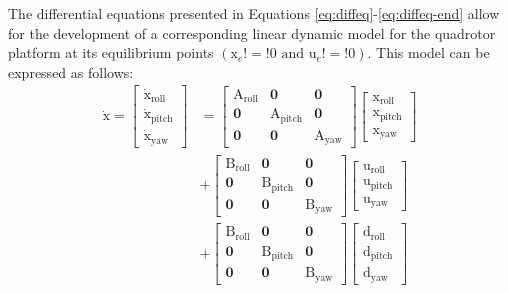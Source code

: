\documentclass[3p,times]{elsarticle}
\begin{document}
The differential equations presented in Equations \eqref{eq:diffeq}-\eqref{eq:diffeq-end} allow for the development of a corresponding linear dynamic model for the quadrotor platform at its equilibrium points $(\boldsymbol{{\mathrm{x}}}_e!=!0 \text{ and } \boldsymbol{{\mathrm{u}}}_e!=!0)$. This model can be expressed as follows:
\begin{equation}
	\begin{split}
		\boldsymbol{{\mathrm{\dot x}}} = \begin{bmatrix}
			\boldsymbol{{\mathrm{\dot x_{\text{roll}}}}}\\
			\boldsymbol{{\mathrm{\dot x_{\text{pitch}}}}}\\
			\boldsymbol{{\mathrm{\dot x_{\text{yaw}}}}}
		\end{bmatrix} &= \begin{bmatrix}
			\boldsymbol{{\mathrm{A_{\text{roll}}}}} & \boldsymbol{0} & \boldsymbol{0}\\
			\boldsymbol{0} & \boldsymbol{{\mathrm{A_{\text{pitch}}}}} & \boldsymbol{0} \\
			\boldsymbol{0} & \boldsymbol{0} & \boldsymbol{{\mathrm{A_{\text{yaw}}}}}
		\end{bmatrix} \begin{bmatrix}
			\boldsymbol{{\mathrm{x_{\text{roll}}}}}\\
			\boldsymbol{{\mathrm{x_{\text{pitch}}}}}\\
			\boldsymbol{{\mathrm{x_{\text{yaw}}}}}
		\end{bmatrix}
		\\[1em]
		& + \begin{bmatrix}
			\boldsymbol{{\mathrm{B_{\text{roll}}}}} & \boldsymbol{0} & \boldsymbol{0}\\
			\boldsymbol{0} & \boldsymbol{{\mathrm{B_{\text{pitch}}}}} & \boldsymbol{0} \\
			\boldsymbol{0} & \boldsymbol{0} & \boldsymbol{{\mathrm{B_{\text{yaw}}}}}
		\end{bmatrix}
		\begin{bmatrix}
			\boldsymbol{{\mathrm{u_{\text{roll}}}}}\\
			\boldsymbol{{\mathrm{u_{\text{pitch}}}}}\\
			\boldsymbol{{\mathrm{u_{\text{yaw}}}}}
		\end{bmatrix}\\[1em]
		& + \begin{bmatrix}
			\boldsymbol{{\mathrm{B_{\text{roll}}}}} & \boldsymbol{0} & \boldsymbol{0}\\
			\boldsymbol{0} & \boldsymbol{{\mathrm{B_{\text{pitch}}}}} & \boldsymbol{0} \\
			\boldsymbol{0} & \boldsymbol{0} & \boldsymbol{{\mathrm{B_{\text{yaw}}}}}
		\end{bmatrix} \begin{bmatrix}
			\boldsymbol{{\mathrm{d_{\text{roll}}}}}\\
			\boldsymbol{{\mathrm{d_{\text{pitch}}}}}\\
			\boldsymbol{{\mathrm{d_{\text{yaw}}}}}
		\end{bmatrix}
	\end{split}
\end{equation}
\end{document}
